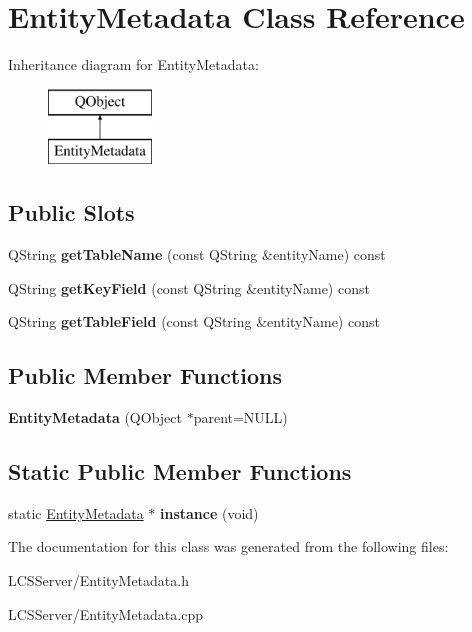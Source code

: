 \hypertarget{class_entity_metadata}{}\section{Entity\+Metadata Class Reference}
\label{class_entity_metadata}
Inheritance diagram for Entity\+Metadata\+:\begin{figure}[H]
\begin{center}
\leavevmode
\includegraphics[height=2.000000cm]{class_entity_metadata}
\end{center}
\end{figure}
\subsection*{Public Slots}
\begin{DoxyCompactItemize}
\item 
\mbox{\label{class_entity_metadata_ae1e3ddaa6d5e273e2a570c7dd8c4c67f}} 
Q\+String {\bfseries get\+Table\+Name} (const Q\+String \&entity\+Name) const
\item 
\mbox{\label{class_entity_metadata_a7001c5eaf5f4a32e3536cc218764de2b}} 
Q\+String {\bfseries get\+Key\+Field} (const Q\+String \&entity\+Name) const
\item 
\mbox{\label{class_entity_metadata_aa22160232e36df2ee7ba52e29194cafb}} 
Q\+String {\bfseries get\+Table\+Field} (const Q\+String \&entity\+Name) const
\end{DoxyCompactItemize}
\subsection*{Public Member Functions}
\begin{DoxyCompactItemize}
\item 
\mbox{\label{class_entity_metadata_a517cbc300798b6d9cdddb2d7d00c0e4e}} 
{\bfseries Entity\+Metadata} (Q\+Object $\ast$parent=N\+U\+LL)
\end{DoxyCompactItemize}
\subsection*{Static Public Member Functions}
\begin{DoxyCompactItemize}
\item 
\mbox{\label{class_entity_metadata_a4aa1b5e44eea34614fcea132ecbd05ac}} 
static \hyperlink{class_entity_metadata}{Entity\+Metadata} $\ast$ {\bfseries instance} (void)
\end{DoxyCompactItemize}


The documentation for this class was generated from the following files\+:\begin{DoxyCompactItemize}
\item 
L\+C\+S\+Server/Entity\+Metadata.\+h\item 
L\+C\+S\+Server/Entity\+Metadata.\+cpp\end{DoxyCompactItemize}
